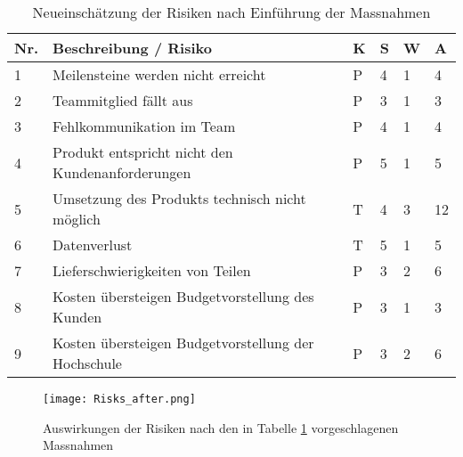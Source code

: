 \vspace{1em}

\begin{table}[htb]
	\begin{tabularx}{\textwidth}{|l|X|l|l|l||l|}
		\hline
		\textbf{Nr.} & \textbf{Beschreibung / Risiko} & \textbf{K} & \textbf{S} & \textbf{W} & \textbf{A} \\
		\hline
		1 & Meilensteine werden nicht erreicht & P & 4 & 1 & 4 \\
		\hline
		2 & Teammitglied fällt aus & P & 3 & 1 & 3 \\
		\hline
		3 & Fehlkommunikation im Team & P & 4 & 1 & 4 \\
		\hline
		4 & Produkt entspricht nicht den Kundenanforderungen & P & 5 & 1 & 5 \\
		\hline
		5 & Umsetzung des Produkts technisch nicht möglich & T & 4 & 3 & 12 \\
		\hline
		6 & Datenverlust & T & 5 & 1 & 5 \\
		\hline
		7 & Lieferschwierigkeiten von Teilen & P & 3 & 2 & 6 \\
		\hline
		8 & Kosten übersteigen Budgetvorstellung des Kunden & P & 3 & 1 & 3\\
		\hline
		9 & Kosten übersteigen Budgetvorstellung der Hochschule & P & 3 & 2 & 6\\
		\hline
	\end{tabularx}
	\caption{Neueinschätzung der Risiken nach Einführung der Massnahmen}
	\label{tbl:Massnahmen}
\end{table}

\vspace{1em}

\begin{figure}[h!]
	\centering
	\texttt{[image: Risks\_after.png]}
	\caption{Auswirkungen der Risiken nach den in Tabelle \ref{tbl:Massnahmen} vorgeschlagenen Massnahmen}
\end{figure}
